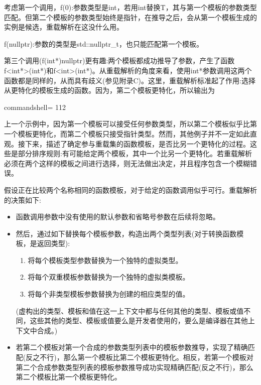 考虑第一个调用，f(0):参数类型是int，若用int替换T，其与第一个模板的参数类型匹配。但第二个模板的参数类型始终是指针，在推导之后，会从第一个模板生成的实例是候选，重载解析在这没什么用。

f(nullptr):参数的类型是std::nullptr\_t，也只能匹配第一个模板。

第三个调用(f(int*)nullptr)更有趣:两个模板都成功推导了参数，产生了函数f<int*>(int*)和f<int>(int*)。从重载解析的角度来看，使用int*参数调用这两个函数都是同样的，从而具有歧义(参见附录C)。这里，重载解析标准起了作用:选择从更特化的模板生成的函数。因为，第二个模板更特化，所以输出为

\begin{tcblisting}{commandshell={}}
112
\end{tcblisting}


上一个示例中，因为第一个模板可以接受任何参数类型，所以第二个模板似乎比第一个模板更特化，而第二个模板只接受指针类型。然而，其他例子并不一定如此直观。接下来，描述了确定参与重载集的函数模板，是否比另一个更特化的过程。这些是部分排序规则:有可能给定两个模板，其中一个比另一个更特化。若重载解析必须在两个这样的模板之间进行选择，则无法做出决定，并且程序包含一个模糊错误。

假设正在比较两个名称相同的函数模板，对于给定的函数调用似乎可行。重载解析的决策如下:

\begin{itemize}
\item 
函数调用参数中没有使用的默认参数和省略号参数在后续将忽略。

\item 
然后，通过如下替换每个模板参数，构造出两个类型列表(对于转换函数模板，是返回类型):

\begin{enumerate}
\item 
将每个模板类型参数替换为一个独特的虚拟类型。

\item 
将每个双重模板参数替换为一个独特的虚拟类模板。

\item 
将每个非类型模板参数替换为创建的相应类型的值。
\end{enumerate}

(虚构出的类型、模板和值在这一上下文中都与任何其他的类型、模板或值不同，这些其他的类型、模板或值要么是开发者使用的，要么是编译器在其他上下文中合成。)

\item 
若第二个模板对第一个合成的参数类型列表中的模板参数推导，实现了精确匹配(反之不行)，那么第一个模板比第二个模板更特化。相反，若第一个模板对第二个合成参数类型列表的模板参数推导成功实现精确匹配(反之不行)，那么第二个模板比第一个模板更特化。
\end{itemize}

